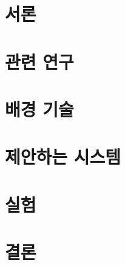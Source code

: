 \documentclass[10pt, a4paper]{article}
\begin{document}
\clearpage
\hypersetup{linkcolor=black}
\tableofcontents
\clearpage
\listoffigures
\clearpage
\listoftables
\clearpage
\hypersetup{linkcolor=blue}





\clearpage
\section{서론}


\clearpage
\section{관련 연구}


\clearpage
\section{배경 기술}


\clearpage
\section{제안하는 시스템}


\clearpage
\section{실험}


\clearpage
\section{결론}


\clearpage




\end{document}
